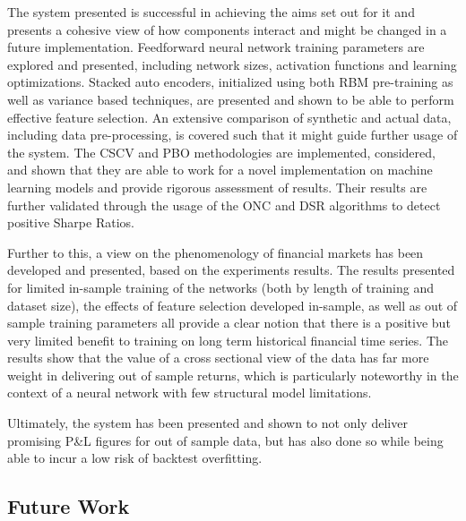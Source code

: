 \documentclass[a4paper,11pt,oneside]{article}
\theoremstyle{plain}
\theoremstyle{definition}
\begin{document}
	The system presented is successful in achieving the aims set out for it and presents a cohesive view of how components interact and might be changed in a future implementation. Feedforward neural network training parameters are explored and presented, including network sizes, activation functions and learning optimizations. Stacked auto encoders, initialized using both RBM pre-training as well as variance based techniques, are presented and shown to be able to perform effective feature selection. An extensive comparison of synthetic and actual data, including data pre-processing, is covered such that it might guide further usage of the system. The CSCV and PBO methodologies are implemented, considered, and shown that they are able to work for a novel implementation on machine learning models and provide rigorous assessment of results. Their results are further validated through the usage of the ONC and DSR algorithms to detect positive Sharpe Ratios. \newline 
	
	Further to this, a view on the phenomenology of financial markets has been developed and presented, based on the experiments results. The results presented for limited in-sample training of the networks (both by length of training and dataset size), the effects of feature selection developed in-sample, as well as out of sample training parameters all provide a clear notion that there is a positive but very limited benefit to training on long term historical financial time series. The results show that the value of a cross sectional view of the data has far more weight in delivering out of sample returns, which is particularly noteworthy in the context of a neural network with few structural model limitations. \newline 
	
	Ultimately, the system has been presented and shown to not only deliver promising P\&L figures for out of sample data, but has also done so while being able to incur a low risk of backtest overfitting.
	
	\subsection{Future Work}
	
\end{document}
